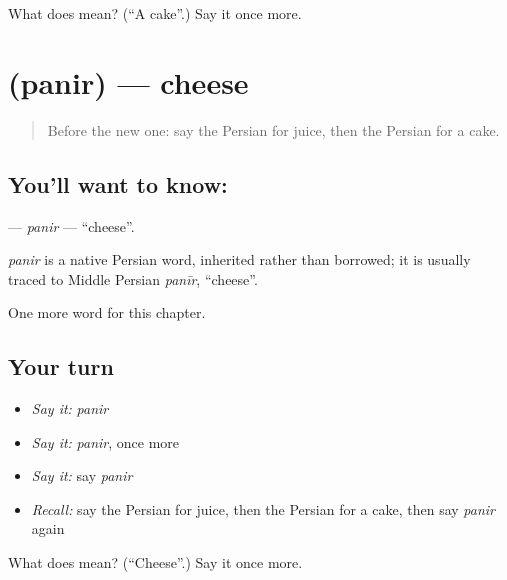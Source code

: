\begin{tcolorbox}[breakable,colback=teal!4,colframe=teal!35!black,title={Before you move on}]
What does  mean? (\textquotedblleft{}A cake\textquotedblright{}.) Say it once more.
\end{tcolorbox}
\section[\texorpdfstring{\fa{پنیر} (panir)}{پنیر (panir)}]{ (panir) — cheese}

\label{lesson:FA-C44-panir}



\begin{quote}
Before the new one: say the Persian for juice, then the Persian for a cake.
\end{quote}

\subsection*{You'll want to know: }
\textbf{} — \emph{panir} — \textquotedblleft{}cheese\textquotedblright{}.

\begin{cousinweb}
\emph{panir} is a native Persian word, inherited rather than borrowed; it is usually traced to Middle Persian \emph{panīr}, \textquotedblleft{}cheese\textquotedblright{}.
\end{cousinweb}

\begin{grammarlens}[title={What you've built}]
One more word for this chapter.
\end{grammarlens}

\subsection*{Your turn}
\begin{itemize}
\raggedright
  \item \emph{Say it:} \emph{panir}
  \item \emph{Say it:} \emph{panir}, once more
  \item \emph{Say it:} say \emph{panir}
  \item \emph{Recall:} say the Persian for juice, then the Persian for a cake, then say \emph{panir} again
\end{itemize}

\begin{tcolorbox}[breakable,colback=teal!4,colframe=teal!35!black,title={Before you move on}]
What does  mean? (\textquotedblleft{}Cheese\textquotedblright{}.) Say it once more.
\end{tcolorbox}

